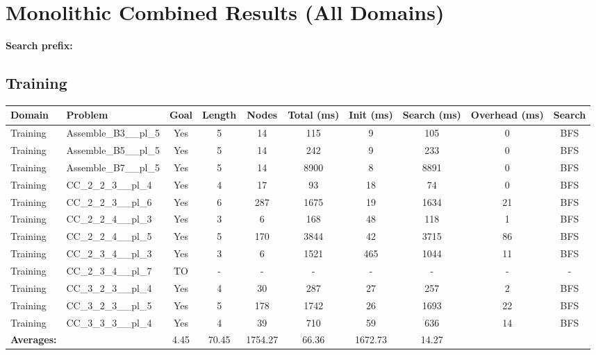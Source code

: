 \documentclass{article}
\begin{document}
\section*{Monolithic Combined Results (All Domains)}
\textbf{Search prefix:} 
\\[0.5cm]
\subsection*{Training}
\begin{tabular}{llcccccccc}
\toprule
Domain & Problem & Goal & Length & Nodes & Total (ms) & Init (ms) & Search (ms) & Overhead (ms) & Search \\
\midrule
Training & Assemble\_B3\_\_pl\_5 & Yes & 5 & 14 & 115 & 9 & 105 & 0 & BFS \\
Training & Assemble\_B5\_\_pl\_5 & Yes & 5 & 14 & 242 & 9 & 233 & 0 & BFS \\
Training & Assemble\_B7\_\_pl\_5 & Yes & 5 & 14 & 8900 & 8 & 8891 & 0 & BFS \\
Training & CC\_2\_2\_3\_\_pl\_4 & Yes & 4 & 17 & 93 & 18 & 74 & 0 & BFS \\
Training & CC\_2\_2\_3\_\_pl\_6 & Yes & 6 & 287 & 1675 & 19 & 1634 & 21 & BFS \\
Training & CC\_2\_2\_4\_\_pl\_3 & Yes & 3 & 6 & 168 & 48 & 118 & 1 & BFS \\
Training & CC\_2\_2\_4\_\_pl\_5 & Yes & 5 & 170 & 3844 & 42 & 3715 & 86 & BFS \\
Training & CC\_2\_3\_4\_\_pl\_3 & Yes & 3 & 6 & 1521 & 465 & 1044 & 11 & BFS \\
Training & CC\_2\_3\_4\_\_pl\_7 & TO & - & - & - & - & - & - & - \\
Training & CC\_3\_2\_3\_\_pl\_4 & Yes & 4 & 30 & 287 & 27 & 257 & 2 & BFS \\
Training & CC\_3\_2\_3\_\_pl\_5 & Yes & 5 & 178 & 1742 & 26 & 1693 & 22 & BFS \\
Training & CC\_3\_3\_3\_\_pl\_4 & Yes & 4 & 39 & 710 & 59 & 636 & 14 & BFS \\
\textbf{Averages:} & & 4.45 & 70.45 & 1754.27 & 66.36 & 1672.73 & 14.27 & \\
\bottomrule
\end{tabular}
\\[0.7cm]
\newpage
\end{document}
